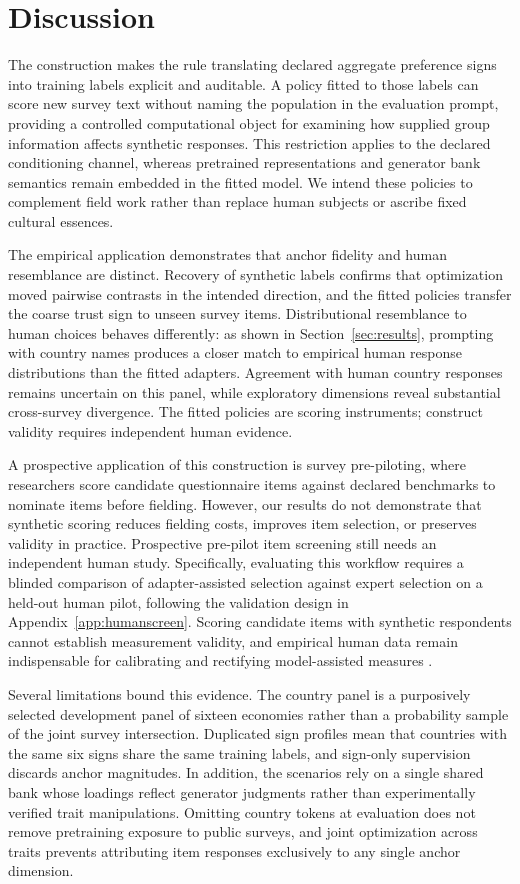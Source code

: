 \section{Discussion}\label{sec:discussion}
The construction makes the rule translating declared aggregate preference signs into training labels explicit and auditable. A policy fitted to those labels can score new survey text without naming the population in the evaluation prompt, providing a controlled computational object for examining how supplied group information affects synthetic responses. This restriction applies to the declared conditioning channel, whereas pretrained representations and generator bank semantics remain embedded in the fitted model. We intend these policies to complement field work rather than replace human subjects or ascribe fixed cultural essences.

The empirical application demonstrates that anchor fidelity and human resemblance are distinct. Recovery of synthetic labels confirms that optimization moved pairwise contrasts in the intended direction, and the fitted policies transfer the coarse trust sign to unseen survey items. Distributional resemblance to human choices behaves differently: as shown in Section~\ref{sec:results}, prompting with country names produces a closer match to empirical human response distributions than the fitted adapters. Agreement with human country responses remains uncertain on this panel, while exploratory dimensions reveal substantial cross-survey divergence. The fitted policies are scoring instruments; construct validity requires independent human evidence.

A prospective application of this construction is survey pre-piloting, where researchers score candidate questionnaire items against declared benchmarks to nominate items before fielding. However, our results do not demonstrate that synthetic scoring reduces fielding costs, improves item selection, or preserves validity in practice. Prospective pre-pilot item screening still needs an independent human study. Specifically, evaluating this workflow requires a blinded comparison of adapter-assisted selection against expert selection on a held-out human pilot, following the validation design in Appendix~\ref{app:humanscreen}. Scoring candidate items with synthetic respondents cannot establish measurement validity, and empirical human data remain indispensable for calibrating and rectifying model-assisted measures \cite{krsteski2026}.

Several limitations bound this evidence. The country panel is a purposively selected development panel of sixteen economies rather than a probability sample of the joint survey intersection. Duplicated sign profiles mean that countries with the same six signs share the same training labels, and sign-only supervision discards anchor magnitudes. In addition, the scenarios rely on a single shared bank whose loadings reflect generator judgments rather than experimentally verified trait manipulations. Omitting country tokens at evaluation does not remove pretraining exposure to public surveys, and joint optimization across traits prevents attributing item responses exclusively to any single anchor dimension.
